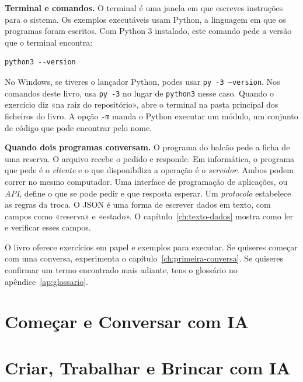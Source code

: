 \textbf{Terminal e comandos.} O terminal é uma janela em que escreves instruções para o sistema. Os exemplos executáveis usam Python, a linguagem em que os programas foram escritos. Com Python 3 instalado, este comando pede a versão que o terminal encontra:

\begin{lstlisting}
python3 --version
\end{lstlisting}

No Windows, se tiveres o lançador Python, podes usar \texttt{py -3 --version}. Nos comandos deste livro, usa \texttt{py -3} no lugar de \texttt{python3} nesse caso. Quando o exercício diz «na raiz do repositório», abre o terminal na pasta principal dos ficheiros do livro. A opção \texttt{-m} manda o Python executar um módulo, um conjunto de código que pode encontrar pelo nome.

\textbf{Quando dois programas conversam.} O programa do balcão pede a ficha de uma reserva. O arquivo recebe o pedido e responde. Em informática, o programa que pede é o \emph{cliente} e o que disponibiliza a operação é o \emph{servidor}. Ambos podem correr no mesmo computador. Uma interface de programação de aplicações, ou \emph{API}, define o que se pode pedir e que resposta esperar. Um \emph{protocolo} estabelece as regras da troca. O JSON é uma forma de escrever dados em texto, com campos como «reserva» e «estado». O capítulo~\ref{ch:texto-dados} mostra como ler e verificar esses campos.

O livro oferece exercícios em papel e exemplos para executar. Se quiseres começar com uma conversa, experimenta o capítulo~\ref{ch:primeira-conversa}. Se quiseres confirmar um termo encontrado mais adiante, tens o glossário no apêndice~\ref{ap:glossario}.

\tableofcontents
\mainmatter
\pagestyle{plain}
\part{Começar e Conversar com IA}






\part{Criar, Trabalhar e Brincar com IA}








